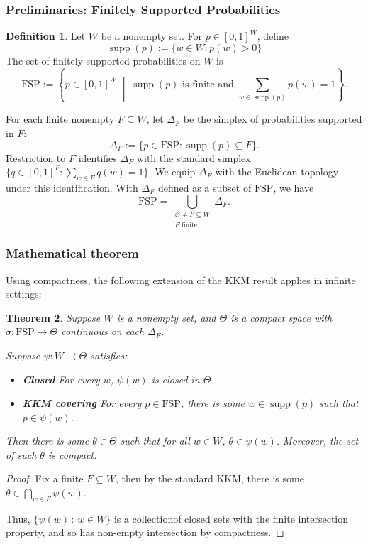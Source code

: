 \documentclass[11pt]{article}
\newtheorem{theorem}{Theorem}[section]
\theoremstyle{definition}
\newtheorem{definition}[theorem]{Definition}
\theoremstyle{remark}
\newcommand{\supp}{\operatorname{supp}}
\newcommand{\given}{\,:\,}
\newcommand{\FSP}{\mathrm{FSP}}
\begin{document}
\subsubsection{Preliminaries: Finitely Supported Probabilities}
\begin{definition}
Let $W$ be a nonempty set. For $p\in[0,1]^W$, define
$$\operatorname{supp}(p):=\{w\in W:p(w)>0\}$$ The set of finitely
supported probabilities on $W$ is
\[
\mathrm{FSP}
:= \left\{p\in[0,1]^W \;\middle|\;
\operatorname{supp}(p)\text{ is finite and }
\sum_{w\in\operatorname{supp}(p)}p(w)=1
\right\}.
\]

For each finite nonempty $F\subseteq W$, let $\Delta_F$ be the simplex
of probabilities supported in $F$:
\[
\Delta_F
:= \{p\in\mathrm{FSP}:\operatorname{supp}(p)\subseteq F\}.
\]
Restriction to $F$ identifies $\Delta_F$ with the standard simplex
$\{q\in[0,1]^F:\sum_{w\in F}q(w)=1\}$. We equip $\Delta_F$ with
the Euclidean topology under this identification. With $\Delta_F$
defined as a subset of $\mathrm{FSP}$, we have
\[
\mathrm{FSP}
= \bigcup_{\substack{\varnothing\ne F\subseteq W\\ F\text{ finite}}}
\Delta_F.
\]
\end{definition}

\subsubsection{Mathematical theorem}

Using compactness, the following extension of the KKM result applies in infinite settings:
\begin{theorem}
	Suppose $W$ is a nonempty set, and $\Theta$ is a compact space with $\sigma:\FSP\to \Theta$ continuous on each $\Delta_F$. 
	
	Suppose $\psi:W\rightrightarrows \Theta$ satisfies:\begin{itemize}
		\item \textbf{Closed} For every $w$, $\psi(w)$ is closed in $\Theta$
		\item \textbf{KKM covering} For every $p\in \FSP$, there is some $w\in\supp(p)$ such that $p\in\psi(w)$.
	\end{itemize}
	Then there is some $\theta\in\Theta$ such that for all $w\in W$, $\theta\in\psi(w)$. Moreover, the set of such $\theta$ is compact.
\end{theorem}
\begin{proof}
	Fix a finite $F\subseteq W$, then by the standard KKM, there is some $\theta\in \bigcap_{w\in F}\psi(w)$. 
	
	Thus, $\{\psi(w)\given w\in W\}$ is a collectionof closed sets with the finite intersection property, and so has non-empty intersection by compactness. 
\end{proof}
\end{document}

